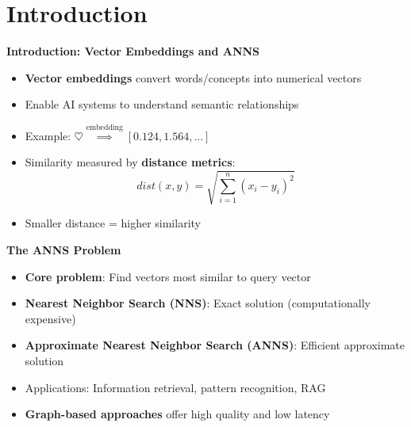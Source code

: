 \section{Introduction}%
\begin{frame}
\begin{center}
\LARGE\textbf{Introduction: Vector Embeddings and ANNS}
\end{center}

\vspace{0.5cm}

\begin{itemize}
    \item \textbf{Vector embeddings} convert words/concepts into numerical vectors
    \item Enable AI systems to understand semantic relationships
    \item Example: $\heartsuit \overset{\text{embedding}}{\implies} [0.124, 1.564, ...]$
    \item Similarity measured by \textbf{distance metrics}:
    $$dist(x, y) = \sqrt{\sum_{i=1}^{n}(x_i - y_i)^2}$$
    \item Smaller distance = higher similarity \cite{wang2024distance}
\end{itemize}
\end{frame}%
\begin{frame}
\begin{center}
\LARGE\textbf{The ANNS Problem}
\end{center}

\vspace{0.5cm}

\begin{itemize}
    \item \textbf{Core problem}: Find vectors most similar to query vector
    \item \textbf{Nearest Neighbor Search (NNS)}: Exact solution (computationally expensive)
    \item \textbf{Approximate Nearest Neighbor Search (ANNS)}: Efficient approximate solution
    \item Applications: Information retrieval, pattern recognition, RAG \cite{arora2018hd}
    \item \textbf{Graph-based approaches} offer high quality and low latency
\end{itemize}
\end{frame}%
